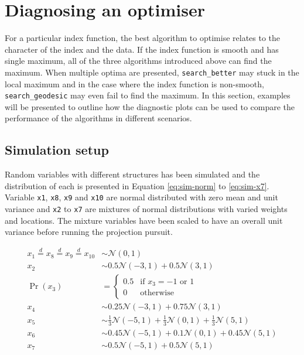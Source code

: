 \documentclass[12pt]{article}
\begin{document}
\hypertarget{application}{%
\section{Diagnosing an optimiser}\label{application}}

For a particular index function, the best algorithm to optimise relates to the character of the index and the data. If the index function is smooth and has single maximum, all of the three algorithms introduced above can find the maximum. When multiple optima are presented, \texttt{search\_better} may stuck in the local maximum and in the case where the index function is non-smooth, \texttt{search\_geodesic} may even fail to find the maximum. In this section, examples will be presented to outline how the diagnostic plots can be used to compare the performance of the algorithms in different scenarios.

\hypertarget{simulation-setup}{%
\subsection{Simulation setup}\label{simulation-setup}}

Random variables with different structures has been simulated and the distribution of each is presented in Equation \ref{eq:sim-norm} to \ref{eq:sim-x7}. Variable \texttt{x1}, \texttt{x8}, \texttt{x9} and \texttt{x10} are normal distributed with zero mean and unit variance and \texttt{x2} to \texttt{x7} are mixtures of normal distributions with varied weights and locations. The mixture variables have been scaled to have an overall unit variance before running the projection pursuit.

\begin{align}
x_1 \overset{d}{=} x_8 \overset{d}{=} x_9 \overset{d}{=} x_{10}& \sim \mathcal{N}(0, 1) \label{eq:sim-norm} \\
x_2 &\sim 0.5 \mathcal{N}(-3, 1) + 0.5 \mathcal{N}(3, 1)\label{eq:sim-x2}\\
\Pr(x_3) &= 
\begin{cases}
0.5 & \text{if $x_3 = -1$ or $1$}\\
0 & \text{otherwise}
\end{cases}\label{eq:sim-x3}\\
x_4 &\sim 0.25 \mathcal{N}(-3, 1) + 0.75 \mathcal{N}(3, 1) \label{eq:sim-x4}\\
x_5 &\sim \frac{1}{3} \mathcal{N}(-5, 1) + \frac{1}{3} \mathcal{N}(0, 1) + \frac{1}{3} \mathcal{N}(5, 1)\label{eq:sim-x5}\\
x_6 &\sim 0.45 \mathcal{N}(-5, 1) + 0.1 \mathcal{N}(0, 1) + 0.45 \mathcal{N}(5, 1)\label{eq:sim-x6}\\
x_7 &\sim 0.5 \mathcal{N}(-5, 1) + 0.5 \mathcal{N}(5, 1) 
\label{eq:sim-x7}
\end{align}
\end{document}
